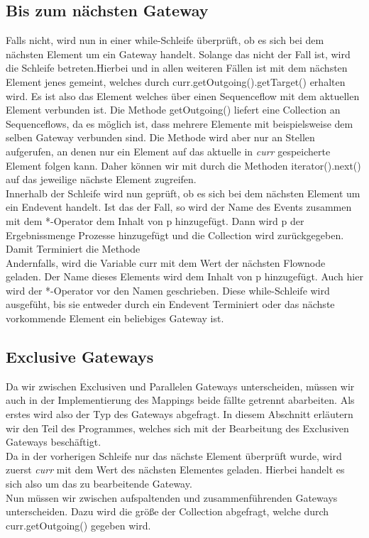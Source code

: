 \subsection{Bis zum nächsten Gateway}\label{Bis zum nächsten Gateway}
Falls nicht, wird nun in einer while-Schleife überprüft, ob es sich bei dem nächsten Element um ein Gateway handelt. Solange das nicht der Fall ist, wird die Schleife betreten.Hierbei und in allen weiteren Fällen ist mit dem nächsten Element jenes gemeint, welches durch curr.getOutgoing().getTarget() erhalten wird. Es ist also das Element welches über einen Sequenceflow mit dem aktuellen Element verbunden ist. Die Methode getOutgoing() liefert eine Collection an Sequenceflows, da es möglich ist, dass mehrere Elemente mit beispielsweise dem selben Gateway verbunden sind. Die Methode wird aber nur an Stellen aufgerufen, an denen nur ein Element auf das aktuelle in \textit{curr} gespeicherte Element folgen kann. Daher können wir mit durch die Methoden iterator().next() auf das jeweilige nächste Element zugreifen.\\
Innerhalb der Schleife wird nun geprüft, ob es sich bei dem nächsten Element um ein Endevent handelt. Ist das der Fall, so wird der Name des Events zusammen mit dem *-Operator dem Inhalt von p hinzugefügt. Dann wird p der Ergebnissmenge Prozesse hinzugefügt und die Collection wird zurückgegeben. Damit Terminiert die Methode\\
Andernfalls, wird die Variable curr mit dem Wert der nächsten Flownode geladen. Der Name dieses Elements wird dem Inhalt von p hinzugefügt. Auch hier wird der *-Operator vor den Namen geschrieben. Diese while-Schleife wird ausgefüht, bis sie entweder durch ein Endevent Terminiert oder das nächste vorkommende Element ein beliebiges Gateway ist.
\subsection{Exclusive Gateways}\label{Exclusive Gateways}
Da wir zwischen Exclusiven und Parallelen Gateways unterscheiden, müssen wir auch in der Implementierung des Mappings beide fällte getrennt abarbeiten. Als erstes wird also der Typ des Gateways abgefragt. In diesem Abschnitt erläutern wir den Teil des Programmes, welches sich mit der Bearbeitung des Exclusiven Gateways beschäftigt.\\
Da in der vorherigen Schleife nur das nächste Element überprüft wurde, wird zuerst \textit{curr} mit dem Wert des nächsten Elementes geladen. Hierbei handelt es sich also um das zu bearbeitende Gateway.\\
Nun müssen wir zwischen aufspaltenden und zusammenführenden Gateways unterscheiden. Dazu wird die größe der Collection abgefragt, welche durch curr.getOutgoing() gegeben wird.
